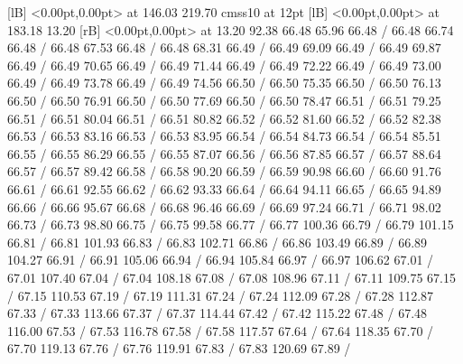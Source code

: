 {  [lB] <0.00pt,0.00pt> at 146.03 219.70
\font\picfont cmss10 at 12pt\picfont
{}  [lB] <0.00pt,0.00pt> at 183.18 13.20
 [rB] <0.00pt,0.00pt> at 13.20 92.38
\setsolid
{} 66.48 65.96 66.48 /
 66.48 66.74 66.48 /
 66.48 67.53 66.48 /
 66.48 68.31 66.49 /
 66.49 69.09 66.49 /
 66.49 69.87 66.49 /
 66.49 70.65 66.49 /
 66.49 71.44 66.49 /
 66.49 72.22 66.49 /
 66.49 73.00 66.49 /
 66.49 73.78 66.49 /
 66.49 74.56 66.50 /
 66.50 75.35 66.50 /
 66.50 76.13 66.50 /
 66.50 76.91 66.50 /
 66.50 77.69 66.50 /
 66.50 78.47 66.51 /
 66.51 79.25 66.51 /
 66.51 80.04 66.51 /
 66.51 80.82 66.52 /
 66.52 81.60 66.52 /
 66.52 82.38 66.53 /
 66.53 83.16 66.53 /
 66.53 83.95 66.54 /
 66.54 84.73 66.54 /
 66.54 85.51 66.55 /
 66.55 86.29 66.55 /
 66.55 87.07 66.56 /
 66.56 87.85 66.57 /
 66.57 88.64 66.57 /
 66.57 89.42 66.58 /
 66.58 90.20 66.59 /
 66.59 90.98 66.60 /
 66.60 91.76 66.61 /
 66.61 92.55 66.62 /
 66.62 93.33 66.64 /
 66.64 94.11 66.65 /
 66.65 94.89 66.66 /
 66.66 95.67 66.68 /
 66.68 96.46 66.69 /
 66.69 97.24 66.71 /
 66.71 98.02 66.73 /
 66.73 98.80 66.75 /
 66.75 99.58 66.77 /
 66.77 100.36 66.79 /
 66.79 101.15 66.81 /
 66.81 101.93 66.83 /
 66.83 102.71 66.86 /
 66.86 103.49 66.89 /
 66.89 104.27 66.91 /
 66.91 105.06 66.94 /
 66.94 105.84 66.97 /
 66.97 106.62 67.01 /
 67.01 107.40 67.04 /
 67.04 108.18 67.08 /
 67.08 108.96 67.11 /
 67.11 109.75 67.15 /
 67.15 110.53 67.19 /
 67.19 111.31 67.24 /
 67.24 112.09 67.28 /
 67.28 112.87 67.33 /
 67.33 113.66 67.37 /
 67.37 114.44 67.42 /
 67.42 115.22 67.48 /
 67.48 116.00 67.53 /
 67.53 116.78 67.58 /
 67.58 117.57 67.64 /
 67.64 118.35 67.70 /
 67.70 119.13 67.76 /
 67.76 119.91 67.83 /
 67.83 120.69 67.89 /
}
